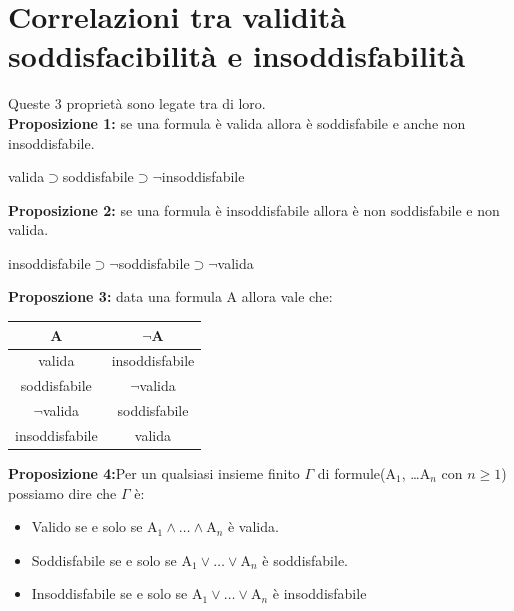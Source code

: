 \documentclass[../main.tex]{subfiles}
\begin{document}
    \section{Correlazioni tra validità soddisfacibilità e insoddisfabilità}
    Queste 3 proprietà sono legate tra di loro.\\
    \textbf{Proposizione 1:} se una formula è valida allora è soddisfabile e anche non insoddisfabile.
    \begin{center}
        valida$\supset$soddisfabile$\supset \lnot$insoddisfabile
    \end{center}
    \textbf{Proposizione 2:} se una formula è insoddisfabile allora è non soddisfabile e non valida.
    \begin{center}
        insoddisfabile$\supset \lnot$soddisfabile$\supset \lnot$valida
    \end{center}
    \textbf{Proposzione 3:} data una formula A allora vale che:
    \begin{center}
        \begin{tabular}{c c}
            \hline
            A & $\lnot$A\\
            \hline
            \hline
            valida & insoddisfabile\\
            soddisfabile & $\lnot$valida\\
            $\lnot$valida & soddisfabile\\
            insoddisfabile & valida\\
        \end{tabular}
    \end{center}
    \textbf{Proposizione 4:}Per un qualsiasi insieme finito $\Gamma$ di formule($\text{A}_1$, \dots $\text{A}_n$ con $n\ge1$) possiamo dire che $\Gamma$ è:
    \begin{itemize}
        \item Valido se e solo se $\text{A}_1 \land \dots \land \text{A}_n$ è valida.
        \item Soddisfabile se e solo se $\text{A}_1 \lor \dots \lor \text{A}_n$ è soddisfabile.
        \item Insoddisfabile se e solo se $\text{A}_1 \lor \dots \lor \text{A}_n$ è insoddisfabile
    \end{itemize}
\end{document}
